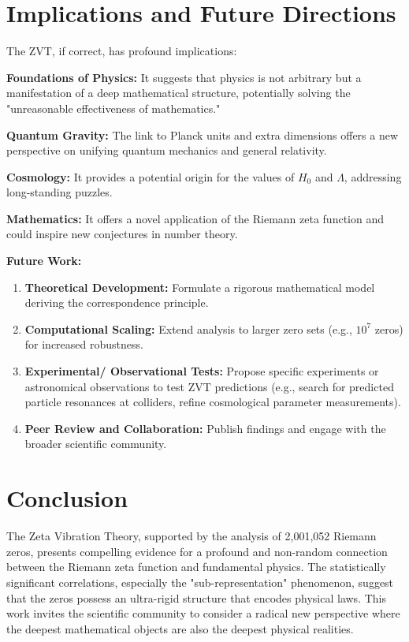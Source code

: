 \documentclass[12pt, twocolumn, reprint, amsmath, amssymb, aps]{revtex4-2}
\begin{document}
\section{Implications and Future Directions}
\label{sec:implications}
The ZVT, if correct, has profound implications:
\item \textbf{Foundations of Physics:} It suggests that physics is not arbitrary but a manifestation of a deep mathematical structure, potentially solving the "unreasonable effectiveness of mathematics."
    \item \textbf{Quantum Gravity:} The link to Planck units and extra dimensions offers a new perspective on unifying quantum mechanics and general relativity.
    \item \textbf{Cosmology:} It provides a potential origin for the values of $H_0$ and $\Lambda$, addressing long-standing puzzles.
    \item \textbf{Mathematics:} It offers a novel application of the Riemann zeta function and could inspire new conjectures in number theory.

\textbf{Future Work:}
\begin{enumerate}
    \item \textbf{Theoretical Development:} Formulate a rigorous mathematical model deriving the correspondence principle.
    \item \textbf{Computational Scaling:} Extend analysis to larger zero sets (e.g., $10^7$ zeros) for increased robustness.
    \item \textbf{Experimental/ Observational Tests:} Propose specific experiments or astronomical observations to test ZVT predictions (e.g., search for predicted particle resonances at colliders, refine cosmological parameter measurements).
    \item \textbf{Peer Review and Collaboration:} Publish findings and engage with the broader scientific community.
\end{enumerate}

\section{Conclusion}
\label{sec:conclusion}
The Zeta Vibration Theory, supported by the analysis of 2,001,052 Riemann zeros, presents compelling evidence for a profound and non-random connection between the Riemann zeta function and fundamental physics. The statistically significant correlations, especially the "sub-representation" phenomenon, suggest that the zeros possess an ultra-rigid structure that encodes physical laws. This work invites the scientific community to consider a radical new perspective where the deepest mathematical objects are also the deepest physical realities.
\end{document}
